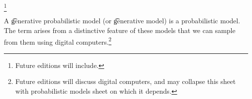 
\footnote{Future editions will include.}


A \t{generative probabilistic model} (or \t{generative model}) is a probabilistic model.
The term  arises from a distinctive feature of these models that we can sample from them using digital computers.\footnote{Future editions will discuss digital computers, and may collapse this sheet with probabilistic models sheet on which it depends.}

\blankpage

